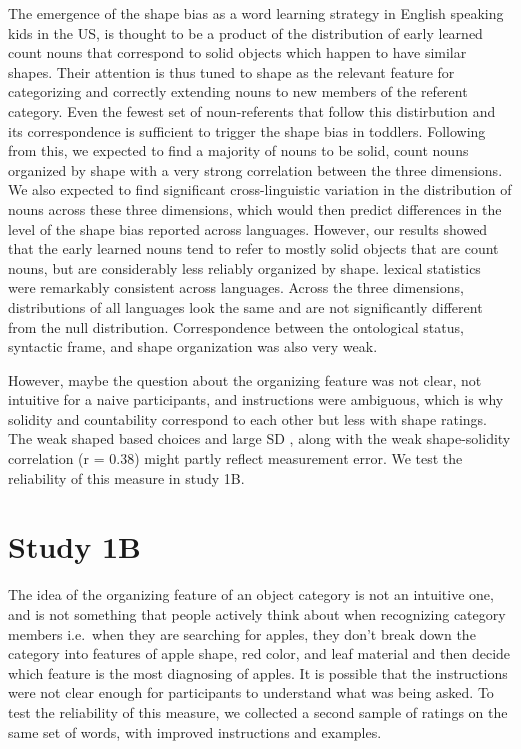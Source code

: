 \documentclass[
  english,
  man]{apa6}
\begin{document}
The emergence of the shape bias as a word learning strategy in English speaking kids in the US, is thought to be a product of the distribution of early learned count nouns that correspond to solid objects which happen to have similar shapes. Their attention is thus tuned to shape as the relevant feature for categorizing and correctly extending nouns to new members of the referent category. Even the fewest set of noun-referents that follow this distirbution and its correspondence is sufficient to trigger the shape bias in toddlers.
Following from this, we expected to find a majority of nouns to be solid, count nouns organized by shape with a very strong correlation between the three dimensions. We also expected to find significant cross-linguistic variation in the distribution of nouns across these three dimensions, which would then predict differences in the level of the shape bias reported across languages. However, our results showed that the early learned nouns tend to refer to mostly solid objects that are count nouns, but are considerably less reliably organized by shape.
lexical statistics were remarkably consistent across languages. Across the three dimensions, distributions of all languages look the same and are not significantly different from the null distribution.
Correspondence between the ontological status, syntactic frame, and shape organization was also very weak.

However, maybe the question about the organizing feature was not clear, not intuitive for a naive participants, and instructions were ambiguous, which is why solidity and countability correspond to each other but less with shape ratings. The weak shaped based choices and large SD , along with the weak shape-solidity correlation (r = 0.38) might partly reflect measurement error. We test the reliability of this measure in study 1B.

\section{Study 1B}\label{study-1b}

The idea of the organizing feature of an object category is not an intuitive one, and is not something that people actively think about when recognizing category members i.e.~when they are searching for apples, they don't break down the category into features of apple shape, red color, and leaf material and then decide which feature is the most diagnosing of apples. It is possible that the instructions were not clear enough for participants to understand what was being asked. To test the reliability of this measure, we collected a second sample of ratings on the same set of words, with improved instructions and examples.
\end{document}
